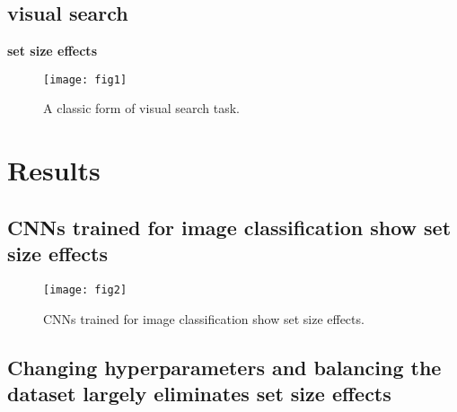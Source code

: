 \documentclass[10pt,letterpaper]{article}
\begin{document}
\subsection{visual search}
\textbf{set size effects}

\begin{figure}[ht]
\begin{center}
\texttt{[image: fig1]}
\end{center}
\caption{A classic form of visual search task.} 
\label{sample-figure}
\end{figure}



\section{Results}

\subsection{CNNs trained for image classification show set size effects}

\begin{figure}[ht]
\begin{center}
\texttt{[image: fig2]}
\end{center}
\caption{CNNs trained for image classification show set size effects.} 
\label{sample-figure}
\end{figure}


\subsection{Changing hyperparameters and balancing the dataset largely 
eliminates set size effects}
\end{document}
